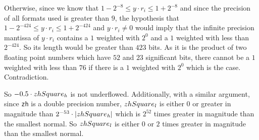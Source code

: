 \begin{enumerate}
Otherwise, since we know that $1 - 2^{-8} \leq y \cdot r_i \leq 1 + 2^{-8}$ and since the precision of all formats used is greater than 
$9$, the hypothesis that $1 - 2^{-424} \leq y \cdot r_i \leq 1 + 2^{-424}$ and $y \cdot r_i \not = 0$ 
would imply that the infinite precision mantissa of 
$y \cdot r_i$ contains a $1$ weighted with $2^0$ and a $1$ weighted with less than $2^{-424}$. So its length would be greater than
$423$ bits. As it is the product of two floating point numbers which have $52$ and $23$ significant bits, there
cannot be a $1$ weighted with less than $76$ if there is a $1$ weighted with $2^0$ which is the case. Contradiction. 

So $-0.5 \cdot zhSquare_{\mathit{h}}$ is not underflowed. Additionally, with a similar argument, since {\tt zh} is a double precision
number, $zhSquare_{\mathit{l}}$ is either $0$ or greater in magnitude than $2^{-53} \cdot \left \vert zhSquare_{\mathit{h}} \right \vert$ which is
$2^{52}$ times greater in magnitude than the smallest normal. So $zhSquare_{\mathit{l}}$ is either $0$ or $2$ times greater in
magnitude than the smallest normal. 


\end{enumerate}
